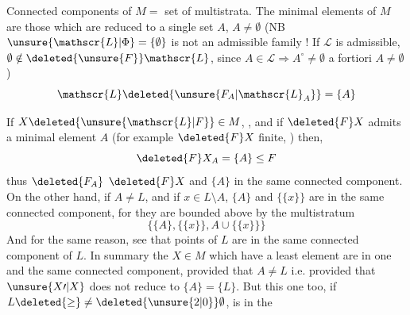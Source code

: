 
Connected components of $M=$ set of multistrata. The minimal elements of $M$ are those which are reduced to a single set $A$,  $A\ne\emptyset$ (NB $\unsure{\mathscr{L}|\Phi}=\{\emptyset\}$ is not an admissible family !\deleted{)} If $\mathscr{L}$ is admissible, $\emptyset\notin\deleted{\unsure{F}}\mathscr{L}$, \deleted{)} since $A\in\mathscr{L}\Rightarrow A^{\circ}\ne\emptyset$ a fortiori $A\ne\emptyset$)
\[
\mathscr{L}\deleted{\unsure{F_{A}|\mathscr{L}_{A}}}=\{A\}
\]

 

If $X\deleted{\unsure{\mathscr{L}|F}}\in M$,  , and if $\deleted{F}X$ admits a  minimal element $A$ (for example $\deleted{F}X$ finite, ) then,
\[
\deleted{F}X_A=\{A\}\leq F
\]
 thus $\deleted{F_A}$  $\deleted{F}X$ and $\{A\}$ in the same connected component. On the other hand,  if $A\ne L$, and if $x\in L\setminus A$, $\{A\}$ and $\{\{x\}\}$ are in the same connected component, for they are bounded above by the multistratum
\[
\bigl\{\{A\},\{\{x\}\},A\cup\{\{x\}\}\bigr\}
\]
 And for the same reason,    see that   points of $L$ are in the same connected component of $L$. In summary the $X\in M$ which have a least element  are in one and the same connected component, provided that $A\ne L$ i.e. provided that $\unsure{X\prime|X}$ does not reduce to $\{A\}=\{L\}$. But this one too, if  $L\deleted{\geq}\ne\deleted{\unsure{2|0}}\emptyset$, is in the
